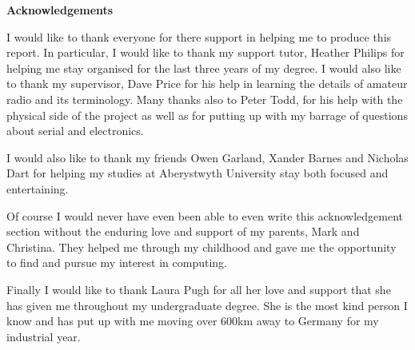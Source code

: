 \thispagestyle{empty}

\begin{center}
    {\LARGE\bf Acknowledgements}
\end{center}

I would like to thank everyone for there support in helping me to produce this report. In particular, I would like to thank my support tutor, Heather Philips for helping me stay organised for the last three years of my degree. I would also like to thank my supervisor, Dave Price for his help in learning the details of amateur radio and its terminology. Many thanks also to Peter Todd, for his help with the physical side of the project as well as for putting up with my barrage of questions about serial and electronics. 

I would also like to thank my friends Owen Garland, Xander Barnes and Nicholas Dart for helping my studies at Aberystwyth University stay both focused and entertaining.

Of course I would never have even been able to even write this acknowledgement section without the enduring love and support of my parents, Mark and Christina. They helped me through my childhood and gave me the opportunity to find and pursue my interest in computing.

Finally I would like to thank Laura Pugh for all her love and support that she has given me throughout my undergraduate degree. She is the most kind person I know and has put up with me moving over 600km away to Germany for my industrial year.
